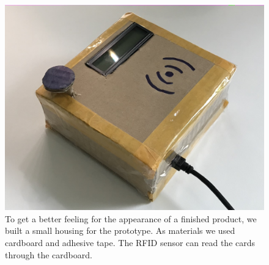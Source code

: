 \begin{figure}
    \center
    \includegraphics[width=\linewidth]{figures/prototype.jpg}
    \caption{To get a better feeling for the appearance of a finished product, we built a small housing for the prototype. As materials we used cardboard and adhesive tape. The RFID sensor can read the cards through the cardboard.}
    \label{fig:prototype}
\end{figure}
